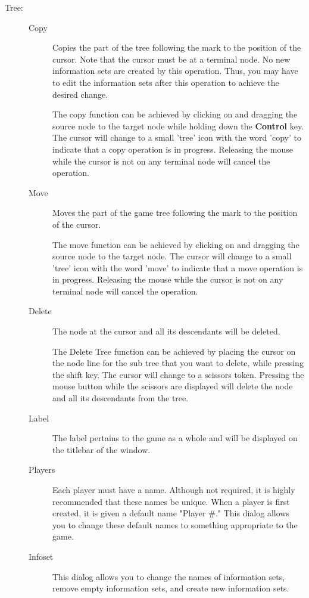 \documentclass[12pt]{report}
\begin{document}
\begin{description}
\item[Tree:]
\begin{description}
\item[Copy] Copies the part of the tree following the mark to the
position of the cursor.  Note that the cursor must be at a terminal
node.  No new information sets are created by this operation.  Thus,
you may have to edit the information sets after this operation to
achieve the desired change.

 The copy function can be
achieved by clicking on and dragging the source node to the target
node while holding down the {\bf Control} key.  The cursor will change
to a small 'tree' icon with the word 'copy' to indicate that a copy
operation is in progress.  Releasing the mouse while the cursor is not
on any terminal node will cancel the operation.
\item[Move] Moves the part of the game tree following the mark to the
position of the cursor.

 The move function can be
achieved by clicking on and dragging the source node to the target
node. The cursor will change to a small 'tree' icon with the word
'move' to indicate that a move operation is in progress.  Releasing
the mouse while the cursor is not on any terminal node will cancel the
operation.
\item[Delete] The node at the cursor and all its descendants will be
deleted.

 The Delete Tree function can be
achieved by placing the cursor on the node line for the sub tree that
you want to delete, while pressing the shift key.  The cursor will
change to a scissors token.  Pressing the mouse button while the
scissors are displayed will delete the node and all its descendants
from the tree.
\item[Label] The label pertains to the game as a whole and will be
displayed on the titlebar of the window.
\item[Players] Each player must have a name.  Although not required,
it is highly recommended that these names be unique.  When a player is
first created, it is given a default name "Player \#."  This dialog
allows you to change these default names to something appropriate to
the game.
\item[Infoset] This dialog allows you to change the names of
information sets, remove empty information sets, and create new
information sets.
\end{description}
\end{description}
\end{document}
